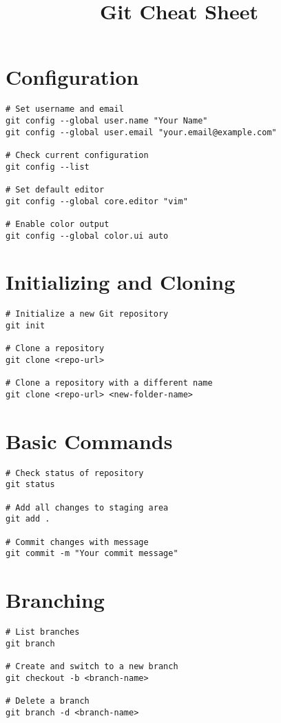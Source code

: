 \documentclass{article}
\title{Git Cheat Sheet}
\author{}
\date{}
\begin{document}
\maketitle

\section{Configuration}
\begin{lstlisting}
# Set username and email
git config --global user.name "Your Name"
git config --global user.email "your.email@example.com"

# Check current configuration
git config --list

# Set default editor
git config --global core.editor "vim"

# Enable color output
git config --global color.ui auto
\end{lstlisting}

\section{Initializing and Cloning}
\begin{lstlisting}
# Initialize a new Git repository
git init

# Clone a repository
git clone <repo-url>

# Clone a repository with a different name
git clone <repo-url> <new-folder-name>
\end{lstlisting}

\section{Basic Commands}
\begin{lstlisting}
# Check status of repository
git status

# Add all changes to staging area
git add .

# Commit changes with message
git commit -m "Your commit message"
\end{lstlisting}

\section{Branching}
\begin{lstlisting}
# List branches
git branch

# Create and switch to a new branch
git checkout -b <branch-name>

# Delete a branch
git branch -d <branch-name>
\end{lstlisting}
\end{document}
